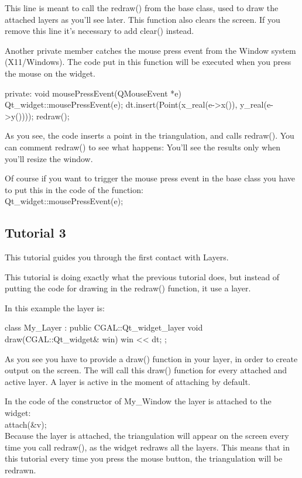 This line is meant to call the redraw() from the 
base class, used to draw the attached layers as you'll see later. This function
also clears the screen. If you remove this line it's necessary to add
clear() instead.

Another private member catches the mouse press event from the Window
system (X11/Windows). The code put in this function will be executed when
you press the mouse on the widget.
\begin{ccExampleCode}
private:
  void mousePressEvent(QMouseEvent *e)
  {
    Qt_widget::mousePressEvent(e);
    dt.insert(Point(x_real(e->x()), y_real(e->y())));
    redraw();
  }
\end{ccExampleCode}
As you see, the code inserts a point in the triangulation, and calls
redraw(). You can comment redraw() to see what happens: You'll see
the results only when you'll resize the window.

Of course if you want to trigger the mouse press event in the base
class you have to put this in the code of the function:\\
Qt\_widget::mousePressEvent(e);

\subsection*{Tutorial 3}

This tutorial guides you through the first contact with Layers.

This tutorial is doing exactly what the previous tutorial does, but
instead of putting the code for drawing in the redraw() function, it use a
layer.

In this example the layer is:
\begin{ccExampleCode}
class My_Layer : public CGAL::Qt_widget_layer{
  void draw(CGAL::Qt_widget& win){
    win << dt;
  }
};
\end{ccExampleCode}
As you see you have to provide a draw() function in your layer, in
order to create output on the screen. The  will call this
draw() function for every attached and active layer. A layer is active
in the moment of attaching by default.

In the code of the constructor of My\_Window the layer is attached to
the widget:\\
attach(\&v);\\
Because the layer is attached, the triangulation will appear on the
screen every time you call redraw(), as the widget redraws all the
layers. This means that in this tutorial every time you press the mouse
button, the triangulation will be redrawn.

